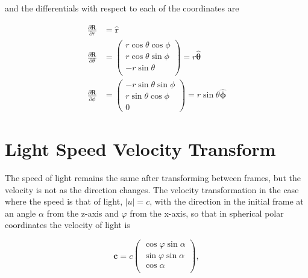 and the differentials with respect to each of the coordinates are

\begin{equation}
	\begin{aligned}
		\frac{\partial\mathbf{R}}{\partial r}      & = \mathbf{\hat{\text{$r$}}} \\
		\frac{\partial\mathbf{R}}{\partial \theta} & =
		\begin{pmatrix}
			r \cos\theta  \cos\phi \\
			r \cos\theta  \sin\phi \\
			-r \sin\theta          \\
		\end{pmatrix}
		=r\mathbf{\hat{\text{$\theta$}}}                                         \\
		\frac{\partial\mathbf{R}}{\partial \phi}   & =
		\begin{pmatrix}
			-r \sin\theta  \sin\phi \\
			r \sin\theta  \cos\phi  \\
			0
		\end{pmatrix}
		= r \sin\theta \mathbf{\hat{\text{$\phi$}}}
	\end{aligned}
\end{equation}

\section{Light Speed Velocity Transform}

The speed of light remains the same after transforming between frames, but the velocity is not as the direction changes. The velocity transformation in the case where the speed is that of light, $|u|=c$, with the direction in the initial frame at an angle $\alpha$ from the z-axis and $\varphi$ from the x-axis, so that in spherical polar coordinates the velocity of light is

\begin{equation}
	\mathbf{c} = c
	\begin{pmatrix}
		\cos{\varphi}\sin{\alpha} \\
		\sin{\varphi}\sin{\alpha} \\
		\cos{\alpha}              \\
	\end{pmatrix},
\end{equation}

